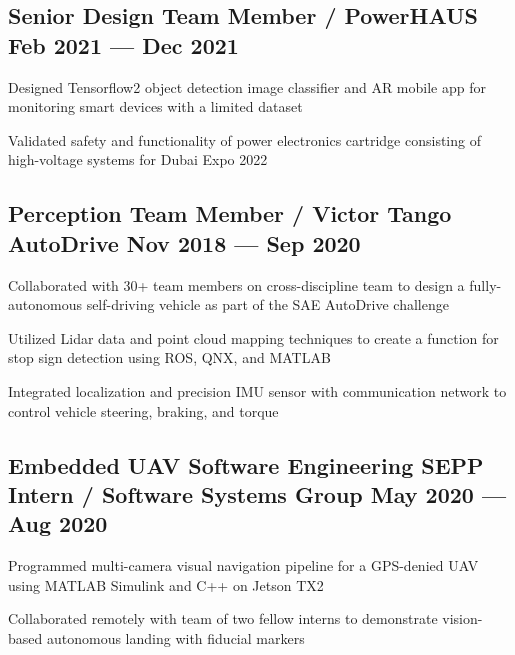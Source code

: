 \subsection{{Senior Design Team Member / PowerHAUS \hfill Feb 2021 --- Dec 2021}}
\begin{zitemize}
	\item Designed Tensorflow2 object detection image classifier and AR mobile app for monitoring smart devices with a
    limited dataset
	\item Validated safety and functionality of power electronics cartridge consisting of high-voltage systems for Dubai Expo 2022
\end{zitemize}

\subsection{{Perception Team Member / Victor Tango AutoDrive \hfill Nov 2018 --- Sep 2020}}
\begin{zitemize}
	\item Collaborated with 30+ team members on cross-discipline team to design a fully-autonomous self-driving
    vehicle as part of the SAE AutoDrive challenge
	\item Utilized Lidar data and point cloud mapping techniques to create a function for stop sign detection using ROS, QNX, and MATLAB
	\item Integrated localization and precision IMU sensor with communication network to control vehicle steering, braking,
    and torque
\end{zitemize}

\subsection{{Embedded UAV Software Engineering SEPP Intern / Software Systems Group  \hfill May 2020 --- Aug 2020}}
\begin{zitemize}
	\item Programmed multi-camera visual navigation pipeline for a GPS-denied UAV using MATLAB Simulink and C++ on Jetson
    TX2 
	\item Collaborated remotely with team of two fellow interns to demonstrate vision-based autonomous landing with fiducial
	markers
\end{zitemize}

